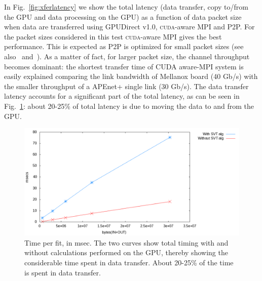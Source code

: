\documentclass[journal]{IEEEtran}
\begin{document}
In Fig.~\ref{fig:xferlatency} we show the total latency (data
transfer, copy to/from the GPU and data processing on the GPU) as a
function of data packet size when data are transferred using GPUDirect
v1.0, \textsc{cuda}-aware MPI and P2P. For the packet sizes considered in this test 
 \textsc{cuda}-aware MPI gives the best performance. This is expected as 
P2P is optimized for small packet sizes
 (see also~\cite{NSS2012} and~\cite{bib_mvapich}). As a matter of fact, for larger packet size, the channel 
throughput becomes dominant: the shortest transfer 
time of CUDA aware-MPI system is easily explained comparing the link bandwidth of Mellanox board (40 Gb/s) 
with the smaller throughput of a APEnet+ single link (30 Gb/s).  
The data transfer latency accounts for a significant part of the total
latency, as can be seen in Fig.~\ref{fig:transferOnly}: about 20-25\%
of total latency is due to moving the data to and from the GPU.



\begin{figure}[!t]
  \centering
  \includegraphics[width=0.85\linewidth]{figures/cudaware}
  \caption{Time per fit, in msec. The two curves show total timing
    with and without calculations performed on the GPU, thereby
    showing the considerable time spent in data transfer. About
    20-25\% of the time is spent in data transfer.}
  \label{fig:transferOnly}
\end{figure}
\end{document}
